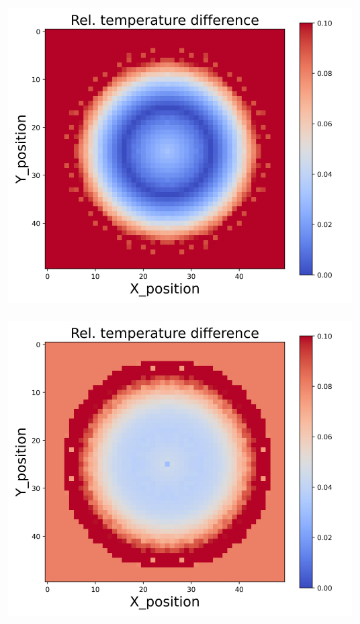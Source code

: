 \begin{figure}[h]
\begin{minipage}{\textwidth}
\begin{subfigure}{0.3\textwidth}
        \end{subfigure}
        \begin{subfigure}{0.3\textwidth}
            \centering
            \includegraphics[width=\textwidth]{figures/raw_data/23/exp/T_bias.jpg}
        \end{subfigure}
        \begin{subfigure}{0.3\textwidth}
            \centering
            \includegraphics[width=\textwidth]{figures/raw_data/24/exp/T_bias.jpg}

\end{subfigure}
\end{minipage}
\end{figure}
